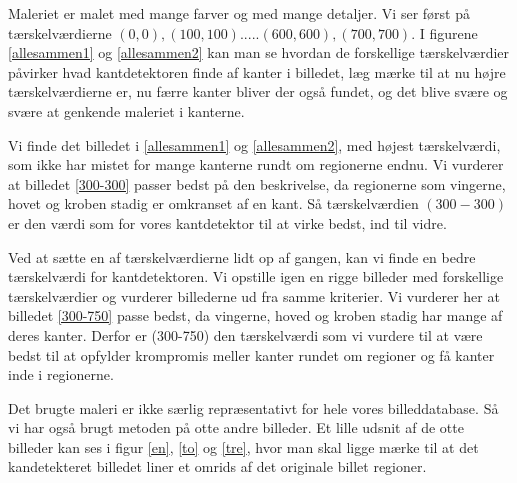 Maleriet er malet med mange farver og med mange detaljer. Vi ser først
på tærskelværdierne $(0,0),(100,100).....(600,600),(700,700)$. I
figurene \ref{allesammen1} og \ref{allesammen2} kan man se hvordan de
forskellige tærskelværdier påvirker hvad kantdetektoren finde af kanter i
billedet, læg mærke til at nu højre tærskelværdierne er, nu færre kanter
bliver der også fundet, og det blive svære og svære at genkende maleriet i kanterne. 

Vi finde det billedet i \ref{allesammen1} og \ref{allesammen2}, med
højest tærskelværdi, som ikke har mistet for mange kanterne rundt om
regionerne endnu. Vi vurderer at billedet \ref{300-300} passer bedst på
den beskrivelse, da regionerne som vingerne, hovet og kroben stadig er
omkranset af en kant. Så tærskelværdien $(300-300)$ er den værdi som for
vores kantdetektor til at virke bedst, ind til vidre.

Ved at sætte en af tærskelværdierne lidt op af gangen, kan vi finde en
bedre tærskelværdi for kantdetektoren. Vi opstille igen en rigge
billeder med forskellige tærskelværdier og vurderer billederne ud fra
samme kriterier. Vi vurderer her at billedet \ref{300-750} passe bedst,
da vingerne, hoved og kroben stadig har mange af deres kanter. Derfor er
(300-750) den tærskelværdi som vi vurdere til at være bedst til at
opfylder krompromis meller kanter rundet om regioner og få kanter inde i
regionerne.

Det brugte maleri er ikke særlig repræsentativt for hele vores
billeddatabase. Så vi har også brugt metoden på otte andre billeder. Et
lille udsnit af de otte billeder kan ses i figur \ref{en}, \ref{to} og
\ref{tre}, hvor man skal ligge mærke til at det kandetekteret billedet
liner et omrids af det originale billet regioner. 

